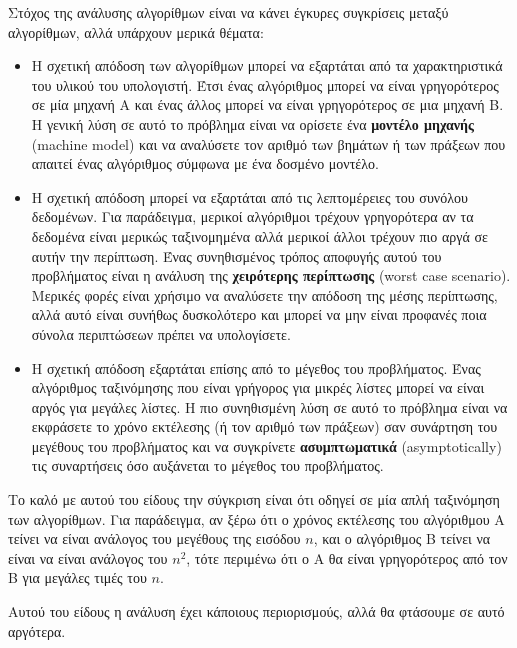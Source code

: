 \documentclass[10pt]{book}
\begin{document}
Στόχος της ανάλυσης αλγορίθμων είναι να κάνει έγκυρες συγκρίσεις μεταξύ αλγορίθμων, αλλά υπάρχουν
μερικά θέματα: 

\begin{itemize}

\item Η σχετική απόδοση των αλγορίθμων μπορεί να εξαρτάται από τα χαρακτηριστικά 
του υλικού του υπολογιστή. Έτσι ένας αλγόριθμος μπορεί να είναι γρηγορότερος σε μία 
μηχανή Α και ένας άλλος μπορεί να είναι γρηγορότερος σε μια μηχανή Β.  Η γενική λύση σε
αυτό το πρόβλημα είναι να ορίσετε ένα {\bf μοντέλο μηχανής} (machine model) και να αναλύσετε τον 
αριθμό των βημάτων ή των πράξεων που απαιτεί ένας αλγόριθμος σύμφωνα με ένα δοσμένο μοντέλο.

\item Η σχετική απόδοση μπορεί να εξαρτάται από τις λεπτομέρειες του συνόλου δεδομένων.
Για παράδειγμα, μερικοί αλγόριθμοι τρέχουν γρηγορότερα αν τα δεδομένα είναι μερικώς ταξινομημένα
αλλά μερικοί άλλοι τρέχουν πιο αργά σε αυτήν την περίπτωση.  Ένας συνηθισμένος τρόπος αποφυγής
αυτού του προβλήματος είναι η ανάλυση της {\bf χειρότερης περίπτωσης} (worst case scenario).  Μερικές
φορές είναι χρήσιμο να αναλύσετε την απόδοση της μέσης περίπτωσης, αλλά αυτό είναι συνήθως δυσκολότερο
και μπορεί να μην είναι προφανές ποια σύνολα περιπτώσεων πρέπει να υπολογίσετε.

\item Η σχετική απόδοση εξαρτάται επίσης από το μέγεθος του προβλήματος.  
Ένας αλγόριθμος ταξινόμησης που είναι γρήγορος για μικρές λίστες μπορεί να είναι 
αργός για μεγάλες λίστες. Η πιο συνηθισμένη λύση σε αυτό το πρόβλημα είναι να εκφράσετε το
χρόνο εκτέλεσης (ή τον αριθμό των πράξεων) σαν συνάρτηση του μεγέθους του προβλήματος και
να συγκρίνετε {\bf ασυμπτωματικά} (asymptotically) τις συναρτήσεις όσο αυξάνεται το μέγεθος του
προβλήματος.

\end{itemize}

Το καλό με αυτού του είδους την σύγκριση είναι ότι οδηγεί σε μία απλή ταξινόμηση των αλγορίθμων.
Για παράδειγμα, αν ξέρω ότι ο χρόνος εκτέλεσης του αλγόριθμου Α τείνει να είναι ανάλογος του μεγέθους
της εισόδου $n$, και ο αλγόριθμος Β τείνει να είναι να είναι ανάλογος του $n^2$, τότε περιμένω ότι 
ο Α θα είναι γρηγορότερος από τον Β για μεγάλες τιμές του $n$.

Αυτού του είδους η ανάλυση έχει κάποιους περιορισμούς, αλλά θα φτάσουμε σε αυτό αργότερα.
\end{document}
